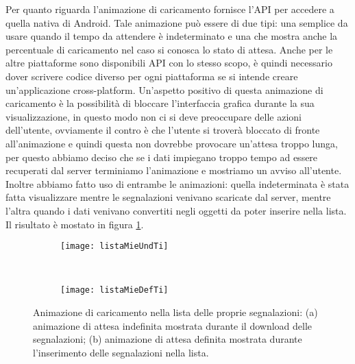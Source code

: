 			\noindent Per quanto riguarda l'animazione di caricamento \tisdk{} fornisce 
			l'API per accedere a quella nativa di Android. 
			Tale animazione può essere di due tipi: una semplice da usare quando 
			il tempo da attendere è indeterminato e 
			una che mostra anche la percentuale di caricamento nel caso si conosca 
			lo stato di attesa.
			Anche per le altre piattaforme sono disponibili API con lo stesso scopo, 
			è quindi necessario dover scrivere codice diverso per ogni piattaforma 
			se si intende creare un'applicazione cross-platform.
			Un'aspetto positivo di questa animazione di caricamento è la possibilità 
			di bloccare l'interfaccia grafica durante la sua visualizzazione, 
			in questo modo non ci si deve preoccupare delle azioni dell'utente, 
			ovviamente il contro è che l'utente si troverà bloccato di fronte 
			all'animazione e quindi questa non dovrebbe provocare un'attesa troppo 
			lunga, per questo abbiamo deciso che se i dati impiegano troppo tempo 
			ad essere recuperati dal server terminiamo l'animazione e mostriamo 
			un avviso all'utente. Inoltre abbiamo fatto uso di entrambe le animazioni: 
			quella indeterminata è stata fatta visualizzare mentre le segnalazioni 
			venivano scaricate dal server, mentre l'altra quando i dati venivano 
			convertiti negli oggetti da poter inserire nella lista. Il risultato 
			è mostato in figura \ref{fig:mieLoadTi}.
			
			\begin{figure}[H]
              \centering
              \begin{subfigure}[b]{0.485\textwidth}
                \texttt{[image: listaMieUndTi]}
                \caption{}
              \end{subfigure}
              ~
              \begin{subfigure}[b]{0.485\textwidth}
                \texttt{[image: listaMieDefTi]}
                \caption{}
              \end{subfigure}
              \caption{Animazione di caricamento nella lista delle proprie segnalazioni: 
                (a) animazione di attesa indefinita mostrata durante il download delle 
                segnalazioni; (b) animazione di attesa definita mostrata durante 
                l'inserimento delle segnalazioni nella lista.
  				}
              \label{fig:mieLoadTi}
            \end{figure}

			 
